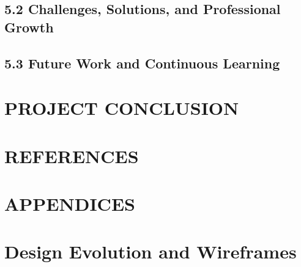\documentclass[12pt,a4paper]{article}
\begin{document}
\subsection*{5.2 Challenges, Solutions, and Professional Growth}


\subsection*{5.3 Future Work and Continuous Learning}


\newpage
\section*{PROJECT CONCLUSION}


\newpage
\section*{REFERENCES}



\newpage
\appendix
\section*{APPENDICES}

\section{Design Evolution and Wireframes}
\label{appendix:design_evolution}

\end{document}
